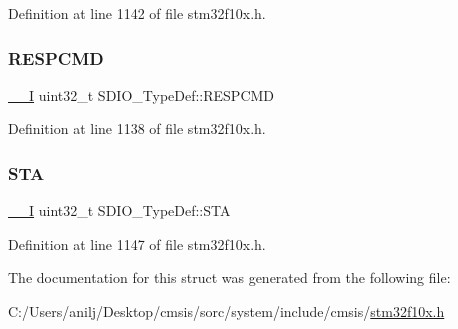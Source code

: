 Definition at line 1142 of file stm32f10x.\+h.

\mbox{\label{struct_s_d_i_o___type_def_a9d881ed6c2fdecf77e872bcc6b404774}} 
\subsubsection{\texorpdfstring{R\+E\+S\+P\+C\+MD}{RESPCMD}}
{\footnotesize\ttfamily \hyperlink{core__sc300_8h_af63697ed9952cc71e1225efe205f6cd3}{\+\_\+\+\_\+I} uint32\+\_\+t S\+D\+I\+O\+\_\+\+Type\+Def\+::\+R\+E\+S\+P\+C\+MD}



Definition at line 1138 of file stm32f10x.\+h.

\mbox{\label{struct_s_d_i_o___type_def_a6b917b09c127e77bd3128bbe19a00499}} 
\subsubsection{\texorpdfstring{S\+TA}{STA}}
{\footnotesize\ttfamily \hyperlink{core__sc300_8h_af63697ed9952cc71e1225efe205f6cd3}{\+\_\+\+\_\+I} uint32\+\_\+t S\+D\+I\+O\+\_\+\+Type\+Def\+::\+S\+TA}



Definition at line 1147 of file stm32f10x.\+h.



The documentation for this struct was generated from the following file\+:\begin{DoxyCompactItemize}
\item 
C\+:/\+Users/anilj/\+Desktop/cmsis/sorc/system/include/cmsis/\hyperlink{stm32f10x_8h}{stm32f10x.\+h}\end{DoxyCompactItemize}
